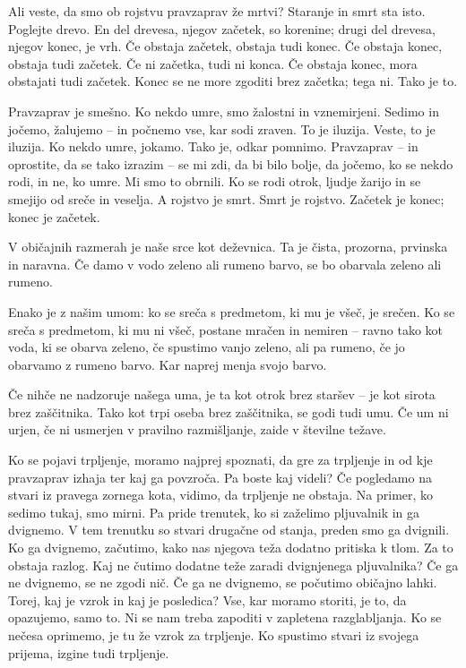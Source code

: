 \clearpage


Ali veste, da smo ob rojstvu pravzaprav že mrtvi? Staranje in smrt sta isto. Poglejte drevo. En del drevesa, njegov začetek, so korenine; drugi del drevesa, njegov konec, je vrh. Če obstaja začetek, obstaja tudi konec. Če obstaja konec, obstaja tudi začetek. Če ni začetka, tudi ni konca. Če obstaja konec, mora obstajati tudi začetek. Konec se ne more zgoditi brez začetka; tega ni. Tako je to.

Pravzaprav je smešno. Ko nekdo umre, smo žalostni in vznemirjeni. Sedimo in jočemo, žalujemo – in počnemo vse, kar sodi zraven. To je iluzija. Veste, to je iluzija. Ko nekdo umre, jokamo. Tako je, odkar pomnimo. Pravzaprav – in oprostite, da se tako izrazim – se mi zdi, da bi bilo bolje, da jočemo, ko se nekdo rodi, in ne, ko umre. Mi smo to obrnili. Ko se rodi otrok, ljudje žarijo in se smejijo od sreče in veselja. A rojstvo je smrt. Smrt je rojstvo. Začetek je konec; konec je začetek.

\clearpage


V običajnih razmerah je naše srce kot deževnica. Ta je čista, prozorna, prvinska in naravna. Če damo v vodo zeleno ali rumeno barvo, se bo obarvala zeleno ali rumeno.

Enako je z našim umom: ko se sreča s predmetom, ki mu je všeč, je srečen. Ko se sreča s predmetom, ki mu ni všeč, postane mračen in nemiren – ravno tako kot voda, ki se obarva zeleno, če spustimo vanjo zeleno, ali pa rumeno, če jo obarvamo z rumeno barvo. Kar naprej menja svojo barvo.


Če nihče ne nadzoruje našega uma, je ta kot otrok brez staršev – je kot sirota brez zaščitnika. Tako kot trpi oseba brez zaščitnika, se godi tudi umu. Če um ni urjen, če ni usmerjen v pravilno razmišljanje, zaide v številne težave.

\clearpage


Ko se pojavi trpljenje, moramo najprej spoznati, da gre za trpljenje in od kje pravzaprav izhaja ter kaj ga povzroča. Pa boste kaj videli? Če pogledamo na stvari iz pravega zornega kota, vidimo, da trpljenje ne obstaja. Na primer, ko sedimo tukaj, smo mirni. Pa pride trenutek, ko si zaželimo pljuvalnik in ga dvignemo. V tem trenutku so stvari drugačne od stanja, preden smo ga dvignili. Ko ga dvignemo, začutimo, kako nas njegova teža dodatno pritiska k tlom. Za to obstaja razlog. Kaj ne čutimo dodatne teže zaradi dvignjenega pljuvalnika? Če ga ne dvignemo, se ne zgodi nič. Če ga ne dvignemo, se počutimo običajno lahki. Torej, kaj je vzrok in kaj je posledica? Vse, kar moramo storiti, je to, da opazujemo, samo to. Ni se nam treba zapoditi v zapletena razglabljanja. Ko se nečesa oprimemo, je tu že vzrok za trpljenje. Ko spustimo stvari iz svojega prijema, izgine tudi trpljenje.

